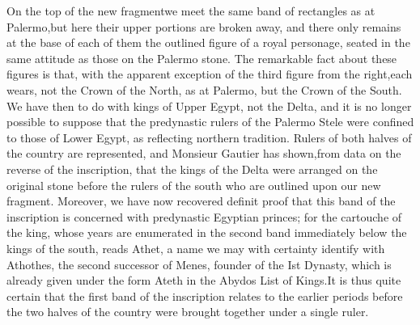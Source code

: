\documentclass[12pt,oneside]{book}
\begin{document}


On the top of the new fragment\footnotemark we meet the same band of rectangles as at Palermo,\footnotemark but here their upper portions are broken away, and there only remains at the base of each of them the outlined figure of a royal personage, seated in the same attitude as those on the Palermo stone. The remarkable fact about these figures is that, with the apparent exception of the third figure from the right,\footnotemark each wears, not the Crown of the North, as at Palermo, but the Crown of the South. We have then to do with kings of Upper Egypt, not the Delta, and it is no longer possible to suppose that the predynastic rulers of the Palermo Stele were confined to those of Lower Egypt, as reflecting northern tradition. Rulers of both halves of the country are represented, and Monsieur Gautier has shown,\footnotemark from data on the reverse of the inscription, that the kings of the Delta were arranged on the original stone before the rulers of the south who are outlined upon our new fragment. Moreover, we have now recovered definit proof that this band of the inscription is concerned with predynastic Egyptian princes; for the cartouche of the king, whose years are enumerated in the second band immediately below the kings of the south, reads Athet, a name we may with certainty identify with Athothes, the second successor of Menes, founder of the Ist Dynasty, which is already given under the form Ateth in the Abydos List of Kings.\footnotemark It is thus quite certain that the first band of the inscription relates to the earlier periods before the two halves of the country were brought together under a single ruler. \par 



\end{document}
